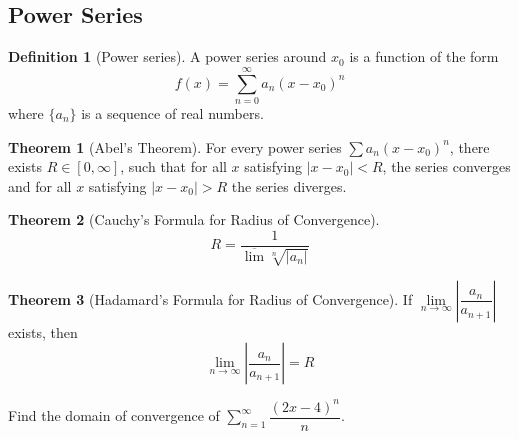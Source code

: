 \documentclass[fleqn, a4paper, 12pt, twoside]{article}
\theoremstyle{definition}
\newtheorem{definition}{Definition}
\theoremstyle{theorem}
\newtheorem{theorem}{Theorem}
\begin{document}
\subsection{Power Series}

\begin{definition}[Power series]
	A power series around $x_0$ is a function of the form
	\begin{equation*}
		f(x) = \sum_{n = 0}^{\infty} a_n (x - x_0)^n
	\end{equation*}
	where $\{a_n\}$ is a sequence of real numbers.
\end{definition}

\begin{theorem}[Abel's Theorem]
	For every power series $\sum a_n (x - x_0)^n$, there exists $R \in [0,\infty]$, such that for all $x$ satisfying $|x - x_0| < R$, the series converges and for all $x$ satisfying $|x - x_0| > R$ the series diverges.
	\label{Abel's_Theorem}
\end{theorem}

\begin{theorem}[Cauchy's Formula for Radius of Convergence]
	\begin{equation*}
		R = \dfrac{1}{\overline{\lim} \sqrt[n]{|a_n|}}
	\end{equation*}
	\label{Cauchy's_Formula_for_Radius_of_Convergence}
\end{theorem}

\begin{theorem}[Hadamard's Formula for Radius of Convergence]
	If $\lim\limits_{n \to \infty} \left| \dfrac{a_n}{a_{n + 1}} \right|$ exists, then
	\begin{equation*}
		\lim\limits_{n \to \infty} \left| \dfrac{a_n}{a_{n + 1}} \right| = R
	\end{equation*}
	\label{Hadamard's_Formula_for_Radius_of_Convergence}
\end{theorem}

\begin{question}
	Find the domain of convergence of $\sum\limits_{n = 1}^{\infty} \dfrac{(2x - 4)^n}{n}$.
\end{question}
\end{document}

